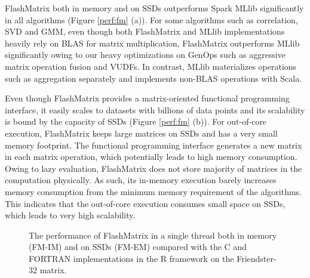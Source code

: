 FlashMatrix both in memory and on SSDs outperforms Spark MLlib significantly
in all algorithms (Figure \ref{perf:fm} (a)). For some algorithms
such as correlation, SVD and GMM, even though both FlashMatrix and MLlib
implementations heavily rely on BLAS for matrix multiplication, FlashMatrix
outperforms MLlib significantly owing to our heavy optimizations on GenOps
such as aggressive matrix operation fusion and VUDFs. In contrast, MLlib
materializes operations such as aggregation separately and implements
non-BLAS operations with Scala.

%		

Even though FlashMatrix provides a matrix-oriented functional programming
interface, it easily scales to datasets with billions of data points and its
scalability is bound by the capacity of SSDs (Figure \ref{perf:fm} (b)).
For out-of-core execution, FlashMatrix keeps large matrices on
SSDs and has a very small memory footprint. The functional programming
interface generates a new matrix in each matrix operation, which potentially
leads to high memory consumption. Owing to lazy evaluation,
FlashMatrix does not store majority of matrices in the computation physically.
As such, its in-memory execution barely increases memory consumption from
the minimum memory requirement of the algorithms. This indicates that
the out-of-core execution consumes small space on SSDs, which leads to
very high scalability.

\begin{figure}
	\begin{center}
		\footnotesize
		\vspace{-15pt}
		
		\vspace{-10pt}
		\caption{The performance of FlashMatrix in a single thread both in
			memory (FM-IM) and on SSDs (FM-EM) compared with the C and FORTRAN
		implementations in the R framework on the Friendster-32 matrix.}
		\label{fig:fmR}
	\end{center}
\end{figure}

